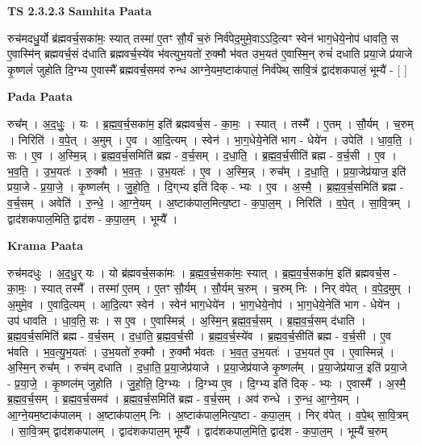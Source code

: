 \documentclass[17pt]{extarticle}
\begin{document}
\textbf{TS 2.3.2.3 } \newline
\textbf{Samhita Paata} \newline

रुच॑मदधु॒र्यो ब्र॑ह्मवर्च॒सका॑मः॒ स्यात् तस्मा॑ ए॒तꣳ सौ॒र्यं च॒रुं निर्व॑पेद॒मुमे॒वाऽऽदि॒त्यꣳ स्वेन॑ भाग॒धेये॒नोप॑ धावति॒ स ए॒वास्मि॑न् ब्रह्मवर्च॒सं द॑धाति ब्रह्मवर्च॒स्ये॑व भ॑वत्युभ॒यतो॑ रु॒क्मौ भ॑वत उभ॒यत॑ ए॒वास्मि॒न् रुचं॑ दधाति प्रया॒जे प्र॑याजे कृ॒ष्णलं॑ जुहोति दि॒ग्भ्य ए॒वास्मै᳚ ब्रह्मवर्च॒समव॑ रुन्ध आग्ने॒यम॒ष्टाक॑पालं॒ निर्व॑पेथ् सावि॒त्रं द्वाद॑शकपालं॒ भूम्यै॑ - [  ] \newline

\textbf{Pada Paata} \newline

रुच᳚म् । अ॒द॒धुः॒ । यः । ब्र॒ह्म॒व॒र्च॒सका॑म॒ इति॑ ब्रह्मवर्च॒स - का॒मः॒ । स्यात् । तस्मै᳚ । ए॒तम् । सौ॒र्यम् । च॒रुम् । निरिति॑ । व॒पे॒त् । अ॒मुम् । ए॒व । आ॒दि॒त्यम् । स्वेन॑ । भा॒ग॒धेये॒नेति॑ भाग - धेये॑न । उपेति॑ । धा॒व॒ति॒ । सः । ए॒व । अ॒स्मि॒न्न् । ब्र॒ह्म॒व॒र्च॒समिति॑ ब्रह्म - व॒र्च॒सम् । द॒धा॒ति॒ । ब्र॒ह्म॒व॒र्च॒सीति॑ ब्रह्म - व॒र्च॒सी । ए॒व । भ॒व॒ति॒ । उ॒भ॒यतः॑ । रु॒क्मौ । भ॒व॒तः॒ । उ॒भ॒यतः॑ । ए॒व । अ॒स्मि॒न्न् । रुच᳚म् । द॒धा॒ति॒ । प्र॒या॒जेप्र॑याज॒ इति॑ प्रया॒जे - प्र॒या॒जे॒ । कृ॒ष्णल᳚म् । जु॒हो॒ति॒ । दि॒ग्‌भ्य इति॑ दिक् - भ्यः । ए॒व । अ॒स्मै॒ । ब्र॒ह्म॒व॒र्च॒समिति॑ ब्रह्म - व॒र्च॒सम् । अवेति॑ । रु॒न्धे॒ । आ॒ग्ने॒यम् । अ॒ष्टाक॑पाल॒मित्य॒ष्टा - क॒पा॒ल॒म् । निरिति॑ । व॒पे॒त् । सा॒वि॒त्रम् । द्वाद॑शकपाल॒मिति॒ द्वाद॑श - क॒पा॒ल॒म् । भूम्यै᳚ ।  \newline


\textbf{Krama Paata} \newline

रुच॑मदधुः । अ॒द॒धु॒र् यः । यो ब्र॑ह्मवर्च॒सका॑मः । ब्र॒ह्म॒व॒र्च॒सका॑मः॒ स्यात् । ब्र॒ह्म॒व॒र्च॒सका॑म॒ इति॑ ब्रह्मवर्च॒स - का॒मः॒ । स्यात् तस्मै᳚ । तस्मा॑ ए॒तम् । ए॒तꣳ सौ॒र्यम् । सौ॒र्यम् च॒रुम् । च॒रुम् निः । निर् व॑पेत् । व॒पे॒द॒मुम् । अ॒मुमे॒व । ए॒वादि॒त्यम् । आ॒दि॒त्यꣳ स्वेन॑ । स्वेन॑ भाग॒धेये॑न । भा॒ग॒धेये॒नोप॑ । भा॒ग॒धेये॒नेति॑ भाग - धेये॑न । उप॑ धावति । धा॒व॒ति॒ सः । स ए॒व । ए॒वास्मिन्न्॑ । अ॒स्मि॒न् ब्र॒ह्म॒व॒र्च॒सम् । ब्र॒ह्म॒व॒र्च॒सम् द॑धाति । ब्र॒ह्म॒व॒र्च॒समिति॑ ब्रह्म - व॒र्च॒सम् । द॒धा॒ति॒ ब्र॒ह्म॒व॒र्च॒सी । ब्र॒ह्म॒व॒र्च॒स्ये॑व । ब्र॒ह्म॒व॒र्च॒सीति॑ ब्रह्म - व॒र्च॒सी । ए॒व भ॑वति । भ॒व॒त्यु॒भ॒यतः॑ । उ॒भ॒यतो॑ रु॒क्मौ । रु॒क्मौ भ॑वतः । भ॒व॒त॒ उ॒भ॒यतः॑ । उ॒भ॒यत॑ ए॒व । ए॒वास्मिन्न्॑ । अ॒स्मि॒न् रुच᳚म् । रुच॑म् दधाति । द॒धा॒ति॒ प्र॒या॒जेप्र॑याजे । प्र॒या॒जेप्र॑याजे कृ॒ष्णल᳚म् । प्र॒या॒जेप्र॑याज॒ इति॑ प्रया॒जे - प्र॒या॒जे॒ । कृ॒ष्णल॑म् जुहोति । जु॒हो॒ति॒ दि॒ग्भ्यः । दि॒ग्भ्य ए॒व । दि॒ग्भ्य इति॑ दिक् - भ्यः । ए॒वास्मै᳚ । अ॒स्मै॒ ब्र॒ह्म॒व॒र्च॒सम् । ब्र॒ह्म॒व॒र्च॒समव॑ । ब्र॒ह्म॒व॒र्च॒समिति॑ ब्रह्म - व॒र्च॒सम् । अव॑ रुन्धे । रु॒न्ध॒ आ॒ग्ने॒यम् । आ॒ग्ने॒यम॒ष्टाक॑पालम् । अ॒ष्टाक॑पाल॒म् निः । अ॒ष्टाक॑पाल॒मित्य॒ष्टा - क॒पा॒ल॒म् । निर् व॑पेत् । व॒पे॒थ् सा॒वि॒त्रम् । सा॒वि॒त्रम् द्वाद॑शकपालम् । द्वाद॑शकपाल॒म् भूम्यै᳚ । द्वाद॑शकपाल॒मिति॒ द्वाद॑श - क॒पा॒ल॒म् । भूम्यै॑ च॒रुम् \newline
\end{document}
